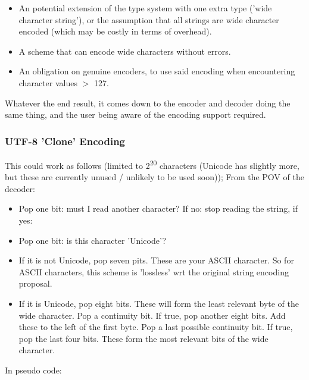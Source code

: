 \begin{itemize}
\item An potential extension of the type system with one extra type
      ('wide character string'), or the assumption that all strings are
      wide character encoded (which may be costly in terms of overhead).
\item A scheme that can encode wide characters without errors.
\item An obligation on genuine encoders, to use said encoding when
      encountering character values $>$ 127.
\end{itemize}

Whatever the end result, it comes down to the encoder and decoder doing
the same thing, and the user being aware of the encoding support required.

\subsubsection{UTF-8 'Clone' Encoding}

This could work as follows
(limited to 2\textsuperscript{20} characters (Unicode has slightly more,
but these are currently unused / unlikely to be used soon));
From the POV of the decoder:

\begin{itemize}
\item Pop one bit: must I read another character?
      If no: stop reading the string, if yes:
\item Pop one bit: is this character 'Unicode'?
\item If it is not Unicode, pop seven pits. These are your ASCII character.
      So for ASCII characters, this scheme is 'lossless' wrt the
      original string encoding proposal.
\item If it is Unicode, pop eight bits. These will form the least relevant
      byte of the wide character. Pop a continuity bit. If true, pop
      another eight bits. Add these to the left of the first byte.
      Pop a last possible continuity bit. If true, pop the last four bits.
      These form the most relevant bits of the wide character.
\end{itemize}

In pseudo code:


